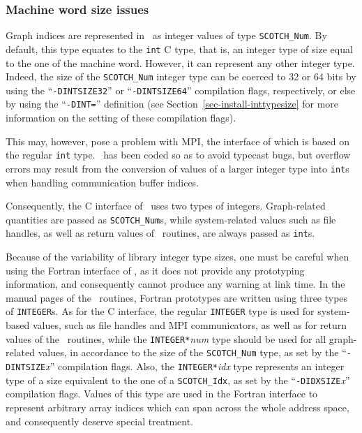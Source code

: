\subsubsection{Machine word size issues}
\label{sec-lib-inttypesize}

Graph indices are represented in \scotch\ as integer values of type
{\tt SCOTCH\_\lbt Num}. By default, this type equates to the {\tt int}
C type, that is, an integer type of size equal to the one of 
the machine word. However, it can represent any other integer
type. Indeed, the size of the {\tt SCOTCH\_\lbt Num} integer type can
be coerced to 32 or 64 bits by using the ``{\tt -DINTSIZE32}'' or
``{\tt -DINTSIZE64}'' compilation flags, respectively, or else by
using the ``{\tt -DINT=}'' definition (see
Section~\ref{sec-install-inttypesize} for more information on the
setting of these compilation flags).

This may, however, pose a problem with MPI, the interface of which is
based on the regular {\tt int} type. \ptscotch\ has been coded so
as to avoid typecast bugs, but overflow errors may result from the
conversion of values of a larger integer type into {\tt int}s when
handling communication buffer indices.

Consequently, the C interface of \scotch\ uses two types of integers.
Graph-related quantities are passed as {\tt SCOTCH\_\lbt Num}s,
while system-related values such as file handles, as well as
return values of \libscotch\ routines, are always passed as
{\tt int}s.

Because of the variability of library integer type sizes, one must be
careful when using the Fortran interface of \scotch, as it does not
provide any prototyping information, and consequently cannot produce
any warning at link time. In the manual pages of the
\libscotch\ routines, Fortran prototypes are written using three types
of {\tt INTEGER}s. As for the C interface, the regular {\tt INTEGER}
type is used for system-based values, such as file handles and MPI
communicators, as well as for return values of the
\libscotch\ routines, while the {\tt INTEGER*}{\it num} type
should be used for all graph-related values, in accordance to the size
of the {\tt SCOTCH\_\lbt Num} type, as set by the
``{\tt -DINTSIZE}{\it x}'' compilation flags. Also, the
{\tt INTEGER*}{\it idx} type represents an integer type of a size
equivalent to the one of a {\tt SCOTCH\_\lbt Idx}, as set by the
``{\tt -DIDXSIZE}{\it x}'' compilation flags. Values of this type are
used in the Fortran interface to represent arbitrary array indices
which can span across the whole address space, and consequently
deserve special treatment.

